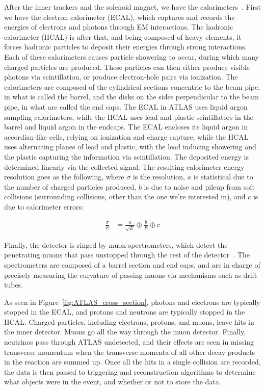 After the inner trackers and the solenoid magnet, we have the calorimeters~\cite{calorimeters_intro}. First we have the electron calorimeter (ECAL), which captures and records the energies of electrons and photons through EM interactions. The hadronic calorimeter (HCAL) is after that, and being composed of heavy elements, it forces hadronic particles to deposit their energies through strong interactions. Each of these calorimeters causes particle showering to occur, during which many charged particles are produced. These particles can then either produce visible photons via scintillation, or produce electron-hole pairs via ionization. The calorimeters are composed of the cylindrical sections concentric to the beam pipe, in what is called the barrel, and the disks on the sides perpendicular to the beam pipe, in what are called the end caps. The ECAL in ATLAS uses liquid argon sampling calorimeters, while the HCAL uses lead and plastic scintillators in the barrel and liquid argon in the endcaps. The ECAL encloses its liquid argon in accordian-like cells, relying on ionization and charge capture, while the HCAL uses alternating planes of lead and plastic, with the lead inducing showering and the plastic capturing the information via scintillation. The deposited energy is determined linearly via the collected signal. The resulting calorimeter energy resolution goes as the following, where $\sigma$ is the resolution, $a$ is statistical due to the number of charged particles produced, $b$ is due to noise and pileup from soft collisions (surrounding collisions, other than the one we're interested in), and $c$ is due to calorimeter errors:

\begin{align}
    \frac{\sigma}{E} &= \frac{a}{\sqrt{E}} \oplus \frac{b}{E} \oplus c
\end{align}

Finally, the detector is ringed by muon spectrometers, which detect the penetrating muons that pass unstopped through the rest of the detector~\cite{ATLAS_TDR}. The spectrometers are composed of a barrel section and end caps, and are in charge of precisely measuring the curvature of passing muons via mechanisms such as drift tubes.

As seen in Figure~\ref{fig:ATLAS_cross_section}, photons and electrons are typically stopped in the ECAL, and protons and neutrons are typically stopped in the HCAL. Charged particles, including electrons, protons, and muons, leave hits in the inner detector. Muons go all the way through the muon detector. Finally, neutrinos pass through ATLAS undetected, and their effects are seen in missing transverse momentum when the transverse momenta of all other decay products in the reaction are summed up. Once all the hits in a single collision are recorded, the data is then passed to triggering and reconstruction algorithms to determine what objects were in the event, and whether or not to store the data.

